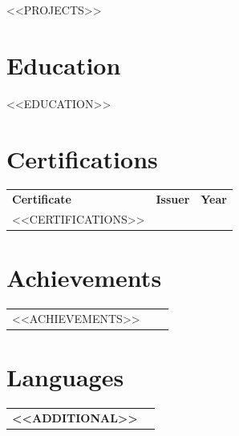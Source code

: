 \documentclass[10pt, a4paper]{article}
\begin{document}
<<PROJECTS>>

\section*{Education}
<<EDUCATION>>

\section*{Certifications}

\renewcommand{\arraystretch}{1.0}
\begin{tabular}{@{} p{8.2cm} >{\centering\arraybackslash}p{7.0cm} >{\raggedleft\arraybackslash}p{2.5cm} @{} }
\textbf{Certificate} & \textbf{Issuer} & \textbf{Year} \\[1pt]
<<CERTIFICATIONS>>
\end{tabular}

\section*{Achievements}

\begin{tabular}{@{} p{8.2cm} >{\centering\arraybackslash}p{7.0cm} >{\raggedleft\arraybackslash}p{2.5cm} @{} }
<<ACHIEVEMENTS>>
\end{tabular}

\section*{Languages}

\begin{tabular}{@{} >{\bfseries}p{3.8cm} p{13cm} @{} }
<<ADDITIONAL>>
\end{tabular}
\end{document}
